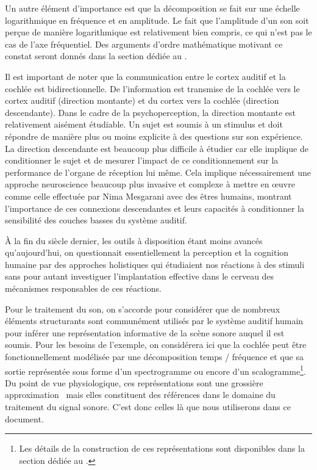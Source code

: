 Un autre élément d'importance est que la décomposition se fait sur une échelle logarithmique en fréquence et en amplitude. Le fait que l'amplitude d'un son soit perçue de manière logarithmique est relativement bien compris, ce qui n'est pas le cas de l'axe fréquentiel. Des arguments d'ordre mathématique motivant ce constat seront donnés dans la section dédiée au .

Il est important de noter que la communication entre le cortex auditif et la cochlée est bidirectionnelle. De l'information est transmise de la cochlée vers le cortex auditif (direction montante) et du cortex vers la cochlée (direction descendante). Dans le cadre de la psychoperception, la direction montante est relativement aisément étudiable. Un sujet est soumis à un stimulus et doit répondre de manière plus ou moins explicite à des questions sur son expérience. La direction descendante est beaucoup plus difficile à étudier car elle implique de conditionner le sujet et de mesurer l'impact de ce conditionnement sur la performance de l'organe de réception lui même. Cela implique nécessairement une approche \og neuroscience \fg beaucoup plus invasive et complexe à mettre en \oe{}uvre comme celle effectuée par Nima Mesgarani avec des êtres humains, montrant l'importance de ces connexions descendantes et leurs capacités à conditionner la sensibilité des couches basses du système auditif.~\cite{mesgarani2012selective}

\`A la fin du siècle dernier, les outils à disposition étant moins avancés qu'aujourd'hui, on questionnait essentiellement la perception et la cognition humaine par des approches \og holistiques \fg qui étudiaient nos réactions à des stimuli sans pour autant investiguer l'implantation effective dans le cerveau des mécanismes responsables de ces réactions.

Pour le traitement du son, on s'accorde pour considérer que de nombreux éléments structurants sont communément utilisés par le système auditif humain pour inférer une représentation informative de la scène sonore auquel il est soumis. Pour les besoins de l'exemple, on considérera ici que la cochlée peut être fonctionnellement modélisée par une décomposition temps / fréquence et que sa sortie représentée sous forme d'un spectrogramme ou encore d'un scalogramme\footnote{Les détails de la construction de ces représentations sont disponibles dans la section dédiée au .}. Du point de vue physiologique, ces représentations sont une grossière approximation~\cite{lyon2017human} mais elles constituent des références dans le domaine du traitement du signal sonore. C'est donc celles là que nous utiliserons dans ce document.

